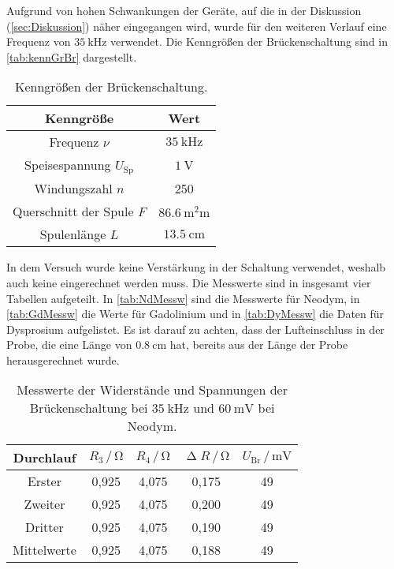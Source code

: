 \noindent
Aufgrund von hohen Schwankungen der Geräte, auf die in der Diskussion (\autoref{sec:Diskussion}) näher eingegangen wird, wurde für den weiteren Verlauf eine Frequenz von $\SI{35}{\kilo\hertz}$ verwendet.
Die Kenngrößen der Brückenschaltung sind in \autoref{tab:kennGrBr} dargestellt. 
\begin{table}[H]
  \centering
  \caption{Kenngrößen der Brückenschaltung.}
  \label{tab:kennGrBr}
  \begin{tabular}{c c}
    \toprule
    Kenngröße & Wert \\
    \midrule
    Frequenz $\nu$ & $\SI{35}{\kilo\hertz}$ \\
    Speisespannung $U_{\text{Sp}}$ & $\SI{1}{\volt}$ \\
    Windungszahl $n$ & 250 \\
    Querschnitt der Spule $F$ & $\SI{86,6}{\square\milli\meter}$ \\
    Spulenlänge $L$ & $\SI{13,5}{\centi\meter}$ \\
    \bottomrule
  \end{tabular}
\end{table}

\noindent
In dem Versuch wurde keine Verstärkung in der Schaltung verwendet, weshalb auch keine eingerechnet werden muss.
Die Messwerte sind in insgesamt vier Tabellen aufgeteilt. In \autoref{tab:NdMessw} sind die Messwerte für Neodym, in \autoref{tab:GdMessw} die Werte für Gadolinium und in \autoref{tab:DyMessw} die Daten für Dysprosium aufgelistet.
Es ist darauf zu achten, dass der Lufteinschluss in der Probe, die eine Länge von $\SI{0,8}{\centi\meter}$ hat, bereits aus der Länge der Probe herausgerechnet wurde.
\begin{table}[H]
  \centering
  \caption{Messwerte der Widerstände und Spannungen der Brückenschaltung bei $\SI{35}{\kilo\hertz}$ und $\SI{60}{\milli\volt}$ bei Neodym.}
  \label{tab:NdMessw}
  \begin{tabular}{c| c c c c}
    \toprule
    Durchlauf & $R_3 \,/\, \si{\ohm}$ & $R_4 \,/\, \si{\ohm}$ & $\upDelta R \,/\, \si{\ohm}$ & $U_{\text{Br}} \,/\, \si{\milli\volt}$ \\%
    \midrule
    Erster & 0,925 & 4,075 & 0,175 & 49 \\
    Zweiter & 0,925 & 4,075 & 0,200 & 49 \\
    Dritter & 0,925 & 4,075 & 0,190 & 49 \\
    Mittelwerte & 0,925 & 4,075 & 0,188 & 49\\
    \bottomrule
  \end{tabular}
\end{table}

